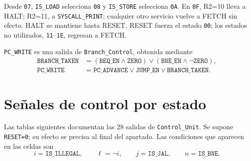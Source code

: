 \documentclass[11pt,a4paper]{article}
\newcommand{\sig}[1]{\texttt{#1}}
\begin{document}
Desde \sig{07}, \sig{IS\_LOAD} selecciona \sig{08} y \sig{IS\_STORE}
selecciona \sig{0A}. En \sig{0F}, R2=10 lleva a HALT; R2=11, a
\sig{SYSCALL\_PRINT}; cualquier otro servicio vuelve a FETCH sin efecto.
HALT se mantiene hasta RESET. RESET fuerza el estado \sig{00}; los estados
no utilizados, \sig{11}--\sig{1E}, regresan a FETCH.

\sig{PC\_WRITE} es una
salida de \sig{Branch\_Control}, obtenida mediante
\begin{align*}
\sig{BRANCH\_TAKEN}&=(\sig{BEQ\_EN}\land\sig{ZERO})
 \lor(\sig{BNE\_EN}\land\neg\sig{ZERO}),\\
\sig{PC\_WRITE}&=\sig{PC\_ADVANCE}\lor\sig{JUMP\_EN}\lor\sig{BRANCH\_TAKEN}.
\end{align*}

\clearpage
\section{Señales de control por estado}

Las tablas siguientes documentan las 28 salidas de \sig{Control\_Unit}.
Se supone \sig{RESET=0}; su efecto se precisa al final del apartado.
Las condiciones que aparecen en las celdas son
\[
i=\sig{IS\_ILLEGAL},\qquad \ell=\neg i,\qquad
j=\sig{IS\_JAL},\qquad n=\sig{IS\_BNE}.
\]
\end{document}

